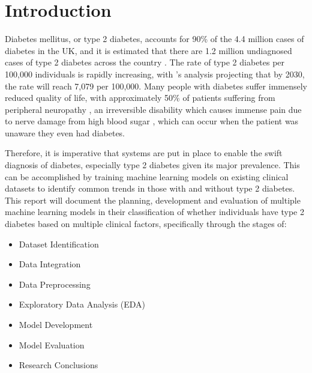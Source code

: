 \documentclass[12pt]{report}
\newcommand{\para}{\vspace{8pt}\noindent}
\begin{document}


\chapter{Introduction}

Diabetes mellitus, or type 2 diabetes, accounts for 90\% of the 4.4 million cases of diabetes in the UK, and it is estimated that 
there are 1.2 million undiagnosed cases of type 2 diabetes across the country \autocite{diabetes_uk_how_nodate}. The rate of type 
2 diabetes per 100,000 individuals is rapidly increasing, with \textcite{khan_epidemiology_2020}'s analysis projecting that by 
2030, the rate will reach 7,079 per 100,000. Many people with diabetes suffer immensely reduced quality of life, with approximately 50\% 
of patients suffering from peripheral neuropathy \autocite{dhanapalaratnam_effect_2024}, an irreversible disability which causes immense pain due 
to nerve damage from high blood sugar \autocite{nhs_peripheral_2022}, which can occur when the patient was unaware they even 
had diabetes. 

\para
Therefore, it is imperative that systems are put in place to enable the swift diagnosis of diabetes, especially type 2 diabetes 
given its major prevalence. This can be accomplished by training machine learning models on existing clinical datasets 
to identify common trends in those with and without type 2 diabetes. This report will document the planning, development 
and evaluation of multiple machine learning models in their classification of whether individuals have type 2 diabetes based 
on multiple clinical factors, specifically through the stages of:

\begin{itemize}
    \item Dataset Identification
    \item Data Integration
    \item Data Preprocessing
    \item Exploratory Data Analysis (EDA)
    \item Model Development 
    \item Model Evaluation
    \item Research Conclusions
\end{itemize}
\end{document}
